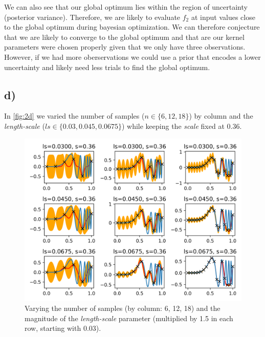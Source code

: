 \documentclass[11pt]{article}
\begin{document}
\noindent We can also see that our global optimum lies within the region of uncertainty (posterior variance). Therefore, we are likely to evaluate $f_2$ at input values close to the global optimum during bayesian optimization. We can therefore conjecture that we are likely to converge to the global optimum and that are our kernel parameters were chosen properly given that we only have three observations. However, if we had more oberservations we could use a prior that encodes a lower uncertainty and likely need less trials to find the global optimum. 


\subsection{d)}\label{subsec:gpr-d}

In \autoref{fig:2d} we varied the number of samples ($n\in\{6,12,18\}$) by column and the \textit{length-scale} ($ls\in\{0.03, 0.045, 0.0675\}$) while keeping the \textit{scale} fixed at $0.36$. 

\begin{figure}[H]
  	\center
  	\includegraphics[width=\textwidth]{assets/2d}
  	\caption{Varying the number of samples (by column: 6, 12, 18) and the magnitude of the \textit{length-scale} parameter (multiplied by 1.5 in each row, starting with 0.03).}
  	\label{fig:2d}
\end{figure}
\end{document}
